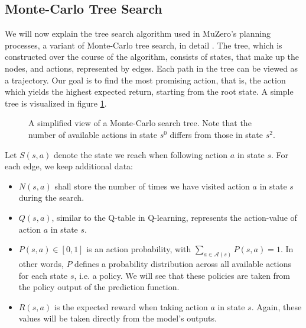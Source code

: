 \newcommand{\argmax}{\operatornamewithlimits{argmax}}

\subsection{Monte-Carlo Tree Search}
We will now explain the tree search algorithm used in MuZero's planning processes, a variant of Monte-Carlo tree search, in detail \cite{alphazero, muzero}. The tree, which is constructed over the course of the algorithm, consists of states, that make up the nodes, and actions, represented by edges. Each path in the tree can be viewed as a trajectory. Our goal is to find the most promising action, that is, the action which yields the highest expected return, starting from the root state. A simple tree is visualized in figure \ref{fig:mcts_simple}.
\begin{figure}[ht]
    \centering
    \caption{A simplified view of a Monte-Carlo search tree. Note that the number of available actions in state $s^0$ differs from those in state $s^2$.}
    \label{fig:mcts_simple}
\end{figure}

Let $S(s, a)$ denote the state we reach when following action $a$ in state $s$. For each edge, we keep additional data:
\begin{itemize}
    \item $N(s, a)$ shall store the number of times we have visited action $a$ in state $s$ during the search.
    \item $Q(s, a)$, similar to the Q-table in Q-learning, represents the action-value of action $a$ in state $s$.
    \item $P(s, a) \in [0, 1]$ is an action probability, with $\sum_{a \in \mathscr{A}(s)} P(s, a) = 1$. In other words, $P$ defines a probability distribution across all available actions for each state $s$, i.e. a policy. We will see that these policies are taken from the policy output of the prediction function.
    \item $R(s, a)$ is the expected reward when taking action $a$ in state $s$. Again, these values will be taken directly from the model's outputs.
\end{itemize}

